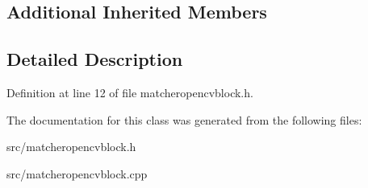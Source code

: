 \subsection*{Additional Inherited Members}


\subsection{Detailed Description}


Definition at line 12 of file matcheropencvblock.\+h.



The documentation for this class was generated from the following files\+:\begin{DoxyCompactItemize}
\item 
src/matcheropencvblock.\+h\item 
src/matcheropencvblock.\+cpp\end{DoxyCompactItemize}

